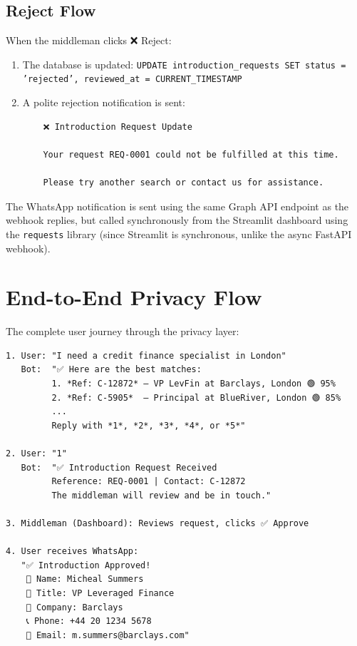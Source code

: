 \documentclass[12pt, a4paper]{report}
\begin{document}
\subsection{Reject Flow}

When the middleman clicks ❌ Reject:

\begin{enumerate}[itemsep=3pt]
    \item The database is updated: \texttt{UPDATE introduction\_requests SET status = 'rejected', reviewed\_at = CURRENT\_TIMESTAMP}
    \item A polite rejection notification is sent:
    \begin{verbatim}
    ❌ Introduction Request Update

    Your request REQ-0001 could not be fulfilled at this time.

    Please try another search or contact us for assistance.
    \end{verbatim}
\end{enumerate}

The WhatsApp notification is sent using the same Graph API endpoint as the webhook replies, but called synchronously from the Streamlit dashboard using the \texttt{requests} library (since Streamlit is synchronous, unlike the async FastAPI webhook).

\section{End-to-End Privacy Flow}

The complete user journey through the privacy layer:

\begin{verbatim}
1. User: "I need a credit finance specialist in London"
   Bot:  "✅ Here are the best matches:
         1. *Ref: C-12872* — VP LevFin at Barclays, London 🟢 95%
         2. *Ref: C-5905*  — Principal at BlueRiver, London 🟢 85%
         ...
         Reply with *1*, *2*, *3*, *4*, or *5*"

2. User: "1"
   Bot:  "✅ Introduction Request Received
         Reference: REQ-0001 | Contact: C-12872
         The middleman will review and be in touch."

3. Middleman (Dashboard): Reviews request, clicks ✅ Approve

4. User receives WhatsApp:
   "✅ Introduction Approved!
    👤 Name: Micheal Summers
    💼 Title: VP Leveraged Finance
    🏢 Company: Barclays
    📞 Phone: +44 20 1234 5678
    📧 Email: m.summers@barclays.com"
\end{verbatim}
\end{document}
